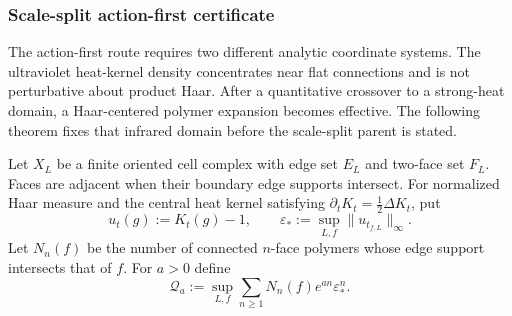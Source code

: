 \documentclass[12pt,a4paper]{article}
\begin{document}
\subsubsection{Scale-split action-first certificate}
\label{p12:subsec:g78-msrg-certificate}

The action-first route requires two different analytic coordinate systems.
The ultraviolet heat-kernel density concentrates near flat connections and is
not perturbative about product Haar.  After a quantitative crossover to a
strong-heat domain, a Haar-centered polymer expansion becomes effective.  The
following theorem fixes that infrared domain before the scale-split parent is
stated.

\begin{definition}
\label{p12:def:heat-polymer-activity-norm}
Let $X_L$ be a finite oriented cell complex with edge set $E_L$ and two-face
set $F_L$.  Faces are adjacent when their boundary edge supports intersect.
For normalized Haar measure and the central heat kernel satisfying
$\partial_tK_t=\frac12\Delta K_t$, put
\[
 u_t(g):=K_t(g)-1,
 \qquad
 \varepsilon_*:=\sup_{L,f}\|u_{t_{f,L}}\|_\infty.
\]
Let $N_n(f)$ be the number of connected $n$-face polymers whose edge support
intersects that of $f$.  For $a>0$ define
\begin{equation}
\label{p12:eq:heat-polymer-activity}
 \mathcal Q_a
 :=\sup_{L,f}\sum_{n\ge1}N_n(f)e^{an}\varepsilon_*^n.
\end{equation}
\end{definition}
\end{document}
